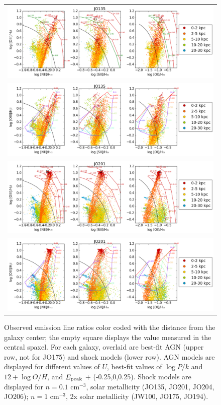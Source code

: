 \documentclass[fleqn,usenatbib]{mnras}
\begin{document}
\begin{figure}
\begin{tabular}{c}
\includegraphics[width=.8\linewidth]{Plots/JO135_vo_dist_NLR.png}\\
\includegraphics[width=.8\linewidth]{Plots/JO135_vo_dist_SH_n1_R.png}\\
\includegraphics[width=.8\linewidth]{Plots/JO201_vo_dist_NLR.png}\\
\includegraphics[width=.8\linewidth]{Plots/JO201_vo_dist_SH_n1_R.png}\\

\end{tabular} 
\caption{Observed emission line ratios color coded with the distance from the galaxy center; the empty square displays the value measured in the central spaxel.	
	For each galaxy, overlaid are best-fit AGN (upper row, not for JO175) and shock models (lower row). AGN models are displayed for different values of $U$, best-fit values of $\log P/k$ and $12 + \log O/H$, and  $E_{\rm peak}$ + (-0.25,0,0.25). Shock models are displayed for $n=0.1$ cm$^{-3}$, solar metallicity (JO135, JO201, JO204, JO206);  $n=1$ cm$^{-3}$, 2x solar metallicity (JW100, JO175, JO194). \label{fig:models}}
\end{figure}
\end{document}
